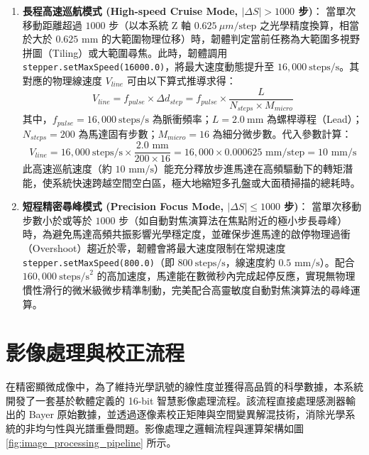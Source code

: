 \begin{enumerate}
    \item \textbf{長程高速巡航模式 (High-speed Cruise Mode, $|\Delta S| > 1000$ 步)}：
    當單次移動距離超過 $1000$ 步（以本系統 Z 軸 $0.625~\mu m/\text{step}$ 之光學精度換算，相當於大於 $0.625\text{ mm}$ 的大範圍物理位移）時，韌體判定當前任務為大範圍多視野拼圖（Tiling）或大範圍尋焦。此時，韌體調用 \texttt{stepper.setMaxSpeed(16000.0)}，將最大速度動態提升至 $16,000~\text{steps/s}$。其對應的物理線速度 $V_{line}$ 可由以下算式推導求得：
    \begin{equation}
        V_{line} = f_{pulse} \times \Delta d_{step} = f_{pulse} \times \frac{L}{N_{steps} \times M_{micro}}
        \label{eq:v_line_derivation}
    \end{equation}
    其中，$f_{pulse} = 16,000~\text{steps/s}$ 為脈衝頻率；$L = 2.0~\text{mm}$ 為螺桿導程（Lead）；$N_{steps} = 200$ 為馬達固有步數；$M_{micro} = 16$ 為細分微步數。代入參數計算：
    \begin{equation}
        V_{line} = 16,000~\text{steps/s} \times \frac{2.0\text{ mm}}{200 \times 16} = 16,000 \times 0.000625\text{ mm/step} = 10\text{ mm/s}
        \label{eq:v_line_calc}
    \end{equation}
    此高速巡航速度（約 $10\text{ mm/s}$）能充分釋放步進馬達在高頻驅動下的轉矩潛能，使系統快速跨越空間空白區，極大地縮短多孔盤或大面積掃描的總耗時。
    
    \item \textbf{短程精密尋峰模式 (Precision Focus Mode, $|\Delta S| \leq 1000$ 步)}：
    當單次移動步數小於或等於 $1000$ 步（如自動對焦演算法在焦點附近的極小步長尋峰）時，為避免馬達高頻共振影響光學穩定度，並確保步進馬達的啟停物理過衝（Overshoot）趨近於零，韌體會將最大速度限制在常規速度 \texttt{stepper.setMaxSpeed(800.0)}（即 $800~\text{steps/s}$，線速度約 $0.5\text{ mm/s}$）。配合 $160,000~\text{steps/s}^2$ 的高加速度，馬達能在數微秒內完成起停反應，實現無物理慣性滑行的微米級微步精準制動，完美配合高靈敏度自動對焦演算法的尋峰運算。
\end{enumerate}

\section{影像處理與校正流程}

在精密顯微成像中，為了維持光學訊號的線性度並獲得高品質的科學數據，本系統開發了一套基於軟體定義的 16-bit 智慧影像處理流程。該流程直接處理感測器輸出的 Bayer 原始數據，並透過逐像素校正矩陣與空間變異解混技術，消除光學系統的非均勻性與光譜重疊問題。影像處理之邏輯流程與運算架構如圖 \ref{fig:image_processing_pipeline} 所示。

